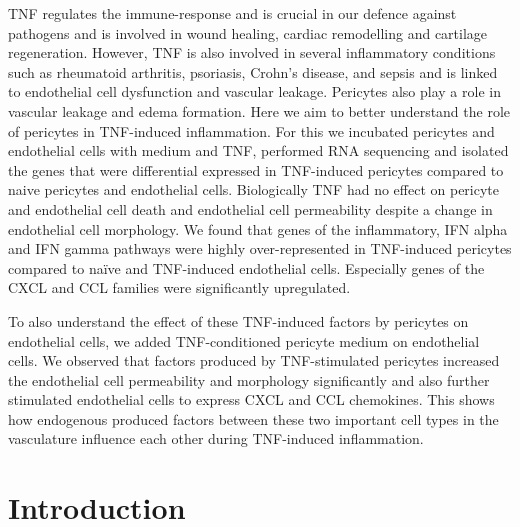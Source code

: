 TNF regulates the immune-response and is crucial in our defence against pathogens and is involved in wound healing, cardiac remodelling and cartilage regeneration. However, TNF is also involved in several inflammatory conditions such as rheumatoid arthritis, psoriasis, Crohn's disease, and sepsis and is linked to endothelial cell dysfunction and vascular leakage. Pericytes also play a role in vascular leakage and edema formation. Here we aim to better understand the role of pericytes in TNF-induced inflammation. For this we incubated pericytes and endothelial cells with medium and TNF, performed RNA sequencing and isolated the genes that were differential expressed in TNF-induced pericytes compared to naive pericytes and endothelial cells. Biologically TNF had no effect on pericyte and endothelial cell death and endothelial cell permeability despite a change in endothelial cell morphology. We found that genes of the inflammatory, IFN alpha and IFN gamma pathways were highly over-represented in TNF-induced pericytes compared to naïve and TNF-induced endothelial cells. Especially genes of the CXCL and CCL families were significantly upregulated.

To also understand the effect of these TNF-induced factors by pericytes on endothelial cells, we added TNF-conditioned pericyte medium on endothelial cells. We observed that factors produced by TNF-stimulated pericytes increased the endothelial cell permeability and morphology significantly and also further stimulated endothelial cells to express CXCL and CCL chemokines. This shows how endogenous produced factors between these two important cell types in the vasculature influence each other during TNF-induced inflammation.

\section*{Introduction}

